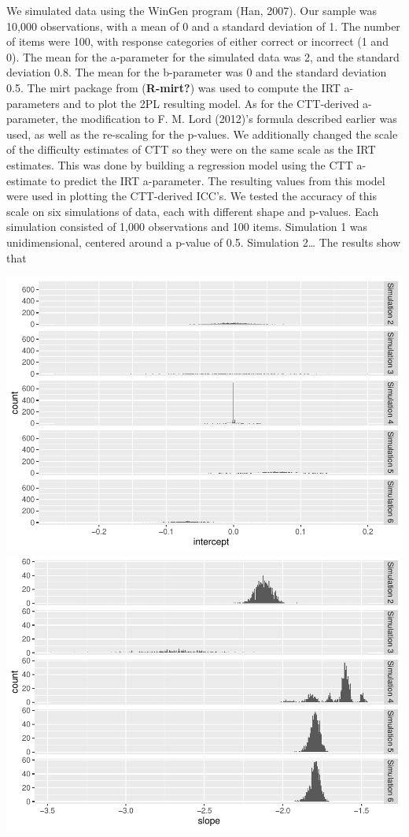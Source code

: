 \documentclass[
  man]{apa6}
\begin{document}
We simulated data using the WinGen program (Han, 2007). Our sample was 10,000 observations, with a mean of 0 and a standard deviation of 1. The number of items were 100, with response categories of either correct or incorrect (1 and 0). The mean for the a-parameter for the simulated data was 2, and the standard deviation 0.8. The mean for the b-parameter was 0 and the standard deviation 0.5. The mirt package from (\textbf{R-mirt?}) was used to compute the IRT a-parameters and to plot the 2PL resulting model. As for the CTT-derived a-parameter, the modification to F. M. Lord (2012)'s formula described earlier was used, as well as the re-scaling for the p-values. We additionally changed the scale of the difficulty estimates of CTT so they were on the same scale as the IRT estimates. This was done by building a regression model using the CTT a-estimate to predict the IRT a-parameter. The resulting values from this model were used in plotting the CTT-derived ICC's.
We tested the accuracy of this scale on six simulations of data, each with different shape and p-values. Each simulation consisted of 1,000 observations and 100 items. Simulation 1 was unidimensional, centered around a p-value of 0.5. Simulation 2\ldots{}
The results show that

\includegraphics{SIOP_files/figure-latex/unnamed-chunk-1-1.pdf} \includegraphics{SIOP_files/figure-latex/unnamed-chunk-1-2.pdf}
\end{document}
